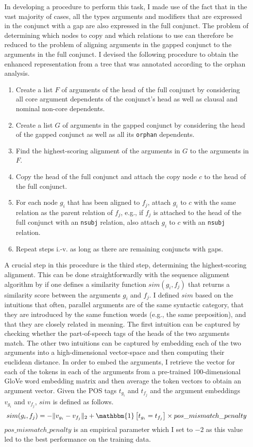 \documentclass[lucida,biblatex]{sp} %
\begin{document}
In developing a procedure to perform this task, I made use of the fact that in the vast majority of cases, all the types arguments and modifiers that are expressed in the conjunct with a gap are also expressed in the full conjunct. The problem of determining which nodes to copy and which relations to use can therefore be reduced to the problem of aligning arguments in the gapped conjunct to the arguments in the full conjunct. I devised the following procedure to obtain the enhanced representation from a tree that was annotated according to the {\sc orphan} analysis.
\begin{enumerate}
\item Create a list $F$ of arguments of the head of the full conjunct by considering all core argument dependents of the conjunct's head as well as clausal and nominal non-core dependents.
\item Create a list $G$ of arguments in the gapped conjunct by considering the head of the gapped conjunct as well as all its {\tt orphan} dependents.
\item Find the highest-scoring alignment of the arguments in $G$ to the arguments in $F$.
\item Copy the head of the full conjunct and attach the copy node $c$ to the head of the full conjunct.
\item For each node $g_i$ that has been aligned to $f_j$, attach $g_i$ to $c$ with the same relation as the parent relation of $f_j$, e.g., if $f_j$ is attached to the head of the full conjunct with an {\tt nsubj} relation, also attach $g_i$ to $c$ with an {\tt nsubj} relation.
\item Repeat steps i.-v. as long as there are remaining conjuncts with gaps.
\end{enumerate}

A crucial step in this procedure is the third step, determining the highest-scoring alignment. This can be done straightforwardly with the sequence alignment algorithm by \textcite{Needleman1970} if one defines a similarity function $sim(g_i, f_j)$ that returns a similarity score between the arguments $g_i$ and $f_j$. I defined $sim$ based on the intuitions that often, parallel arguments are of the same syntactic category, that they are introduced by the same function words (e.g., the same preposition), and that they are closely related in meaning. The first intuition can be captured by checking whether the part-of-speech tags of the heads of the two arguments match. The other two intuitions can be captured by embedding each of the two arguments into a high-dimensional vector-space and then computing their euclidean distance. In order to embed the arguments, I retrieve the vector for each of the tokens in each of the arguments from a pre-trained 100-dimensional GloVe \citep{Pennington2014} word embedding matrix and then average the token vectors to obtain an argument vector. Given the POS tags $t_{g_i}$ and $t_{f_j}$ and the argument embeddings $v_{g_i}$ and $v_{f_j}$, $sim$ is defined as follows.
$$sim(g_i, f_j) = - \lVert v_{g_i} - v_{f_j}\rVert_2 + \mathbbm{1}\left[t_{g_i} = t_{f_j} \right] \times pos\_mismatch\_penalty $$
$pos\_mismatch\_penalty$ is an empirical parameter which I set to $-2$ as this value led to the best performance on the training data.
\end{document}
